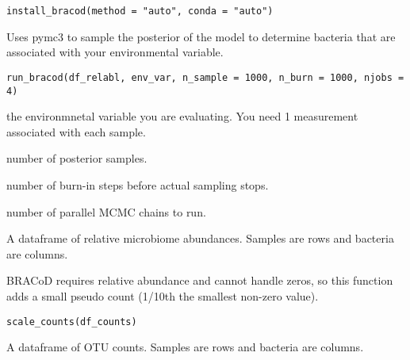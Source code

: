 \documentclass[letterpaper]{book}
\begin{document}
%
\begin{Usage}
\begin{verbatim}
install_bracod(method = "auto", conda = "auto")
\end{verbatim}
\end{Usage}
%
\begin{Description}\relax
Uses pymc3 to sample the posterior of the model to determine bacteria that are
associated with your environmental variable.
\end{Description}
%
\begin{Usage}
\begin{verbatim}
run_bracod(df_relabl, env_var, n_sample = 1000, n_burn = 1000, njobs = 4)
\end{verbatim}
\end{Usage}
%
\begin{Arguments}
\begin{ldescription}
\item[\code{env\_var}] the environmnetal variable you are evaluating. You need 1 measurement associated with each sample.

\item[\code{n\_sample}] number of posterior samples.

\item[\code{n\_burn}] number of burn-in steps before actual sampling stops.

\item[\code{njobs}] number of parallel MCMC chains to run.

\item[\code{df}] A dataframe of relative microbiome abundances. Samples are rows and bacteria are columns.
\end{ldescription}
\end{Arguments}
%
\begin{Description}\relax
BRACoD requires relative abundance and cannot handle zeros, so this function
adds a small pseudo count (1/10th the smallest non-zero value).
\end{Description}
%
\begin{Usage}
\begin{verbatim}
scale_counts(df_counts)
\end{verbatim}
\end{Usage}
%
\begin{Arguments}
\begin{ldescription}
\item[\code{df}] A dataframe of OTU counts. Samples are rows and bacteria are columns.
\end{ldescription}
\end{Arguments}
\end{document}
